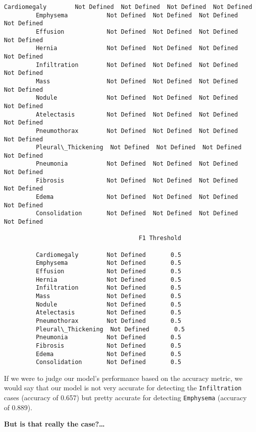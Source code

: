 \documentclass[11pt]{article}
\begin{document}
\begin{Verbatim}[commandchars=\\\{\}]
         Cardiomegaly        Not Defined  Not Defined  Not Defined  Not Defined   
         Emphysema           Not Defined  Not Defined  Not Defined  Not Defined   
         Effusion            Not Defined  Not Defined  Not Defined  Not Defined   
         Hernia              Not Defined  Not Defined  Not Defined  Not Defined   
         Infiltration        Not Defined  Not Defined  Not Defined  Not Defined   
         Mass                Not Defined  Not Defined  Not Defined  Not Defined   
         Nodule              Not Defined  Not Defined  Not Defined  Not Defined   
         Atelectasis         Not Defined  Not Defined  Not Defined  Not Defined   
         Pneumothorax        Not Defined  Not Defined  Not Defined  Not Defined   
         Pleural\_Thickening  Not Defined  Not Defined  Not Defined  Not Defined   
         Pneumonia           Not Defined  Not Defined  Not Defined  Not Defined   
         Fibrosis            Not Defined  Not Defined  Not Defined  Not Defined   
         Edema               Not Defined  Not Defined  Not Defined  Not Defined   
         Consolidation       Not Defined  Not Defined  Not Defined  Not Defined   
         
                                      F1 Threshold  
                                                    
         Cardiomegaly        Not Defined       0.5  
         Emphysema           Not Defined       0.5  
         Effusion            Not Defined       0.5  
         Hernia              Not Defined       0.5  
         Infiltration        Not Defined       0.5  
         Mass                Not Defined       0.5  
         Nodule              Not Defined       0.5  
         Atelectasis         Not Defined       0.5  
         Pneumothorax        Not Defined       0.5  
         Pleural\_Thickening  Not Defined       0.5  
         Pneumonia           Not Defined       0.5  
         Fibrosis            Not Defined       0.5  
         Edema               Not Defined       0.5  
         Consolidation       Not Defined       0.5  
\end{Verbatim}
            
    If we were to judge our model's performance based on the accuracy
metric, we would say that our model is not very accurate for detecting
the \texttt{Infiltration} cases (accuracy of 0.657) but pretty accurate
for detecting \texttt{Emphysema} (accuracy of 0.889).

\textbf{But is that really the case?\ldots{}}
\end{document}
